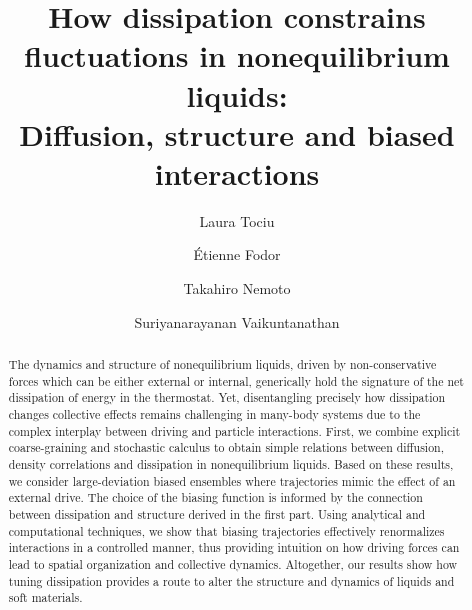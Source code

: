 \documentclass[superscriptaddress, twocolumn, prx, longbibliography, nofootinbib]{revtex4-1}
\begin{document}
\title{How dissipation constrains fluctuations in nonequilibrium liquids:\\Diffusion, structure and biased interactions}
\author{Laura Tociu}

\author{\'Etienne Fodor}

\author{Takahiro Nemoto}

\author{Suriyanarayanan Vaikuntanathan}

\begin{abstract}

The dynamics and structure of nonequilibrium liquids, driven by non-conservative forces which can be either external or internal, generically hold the signature of the net dissipation of energy in the thermostat. Yet, disentangling precisely how dissipation changes collective effects remains challenging in many-body systems due to the complex interplay between driving and particle interactions. First, we combine explicit coarse-graining and stochastic calculus to obtain simple relations between diffusion, density correlations and dissipation in nonequilibrium liquids. Based on these results, we consider large-deviation biased ensembles where trajectories mimic the effect of an external drive. The choice of the biasing function is informed by the connection between dissipation and structure derived in the first part. Using analytical and computational techniques, we show that biasing trajectories effectively renormalizes interactions in a controlled manner, thus providing intuition on how driving forces can lead to spatial organization and collective dynamics. Altogether, our results show how tuning dissipation provides a route to alter the structure and dynamics of liquids and soft materials.

\end{abstract}

\maketitle
\end{document}

